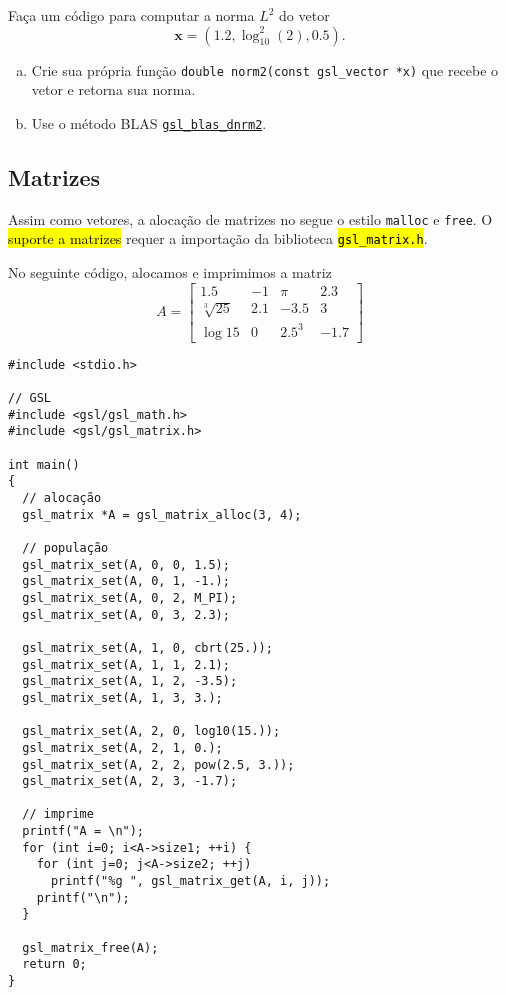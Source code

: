 \documentclass[12pt]{article}
\begin{document}
\begin{exr}
  Faça um código para computar a norma $L^2$ do vetor
  \begin{equation}
    \pmb{x} = (1.2, \log_{10}^2(2), 0.5).
  \end{equation}
  \begin{enumerate}[a)]
  \item Crie sua própria função \lstinline+double norm2(const gsl_vector *x)+ que recebe o vetor e retorna sua norma.
  \item Use o método BLAS \href{https://www.gnu.org/software/gsl/doc/html/blas.html\#c.gsl_blas_dnrm2}{\lstinline+gsl_blas_dnrm2+}.
  \end{enumerate}
\end{exr}

\subsection{Matrizes}\label{sec_mat_subsec_mat}

Assim como vetores, a alocação de matrizes no {\gsl} segue o estilo \lstinline!malloc! e \lstinline!free!. O \hl{suporte a matrizes} requer a importação da biblioteca \hl{\texttt{gsl\_matrix.h}}.

\begin{ex}
  No seguinte código, alocamos e imprimimos a matriz
  \begin{equation}
    A =
    \begin{bmatrix}
      1.5 & -1 & \pi & 2.3\\
      \sqrt[3]{25} & 2.1 & -3.5 & 3\\
      \log 15 & 0 & 2.5^3 & -1.7
    \end{bmatrix}
  \end{equation}

\begin{lstlisting}[caption=matriz.cc]
#include <stdio.h>

// GSL
#include <gsl/gsl_math.h>
#include <gsl/gsl_matrix.h>

int main()
{
  // alocação
  gsl_matrix *A = gsl_matrix_alloc(3, 4);

  // população
  gsl_matrix_set(A, 0, 0, 1.5);
  gsl_matrix_set(A, 0, 1, -1.);
  gsl_matrix_set(A, 0, 2, M_PI);
  gsl_matrix_set(A, 0, 3, 2.3);

  gsl_matrix_set(A, 1, 0, cbrt(25.));
  gsl_matrix_set(A, 1, 1, 2.1);
  gsl_matrix_set(A, 1, 2, -3.5);
  gsl_matrix_set(A, 1, 3, 3.);

  gsl_matrix_set(A, 2, 0, log10(15.));
  gsl_matrix_set(A, 2, 1, 0.);
  gsl_matrix_set(A, 2, 2, pow(2.5, 3.));
  gsl_matrix_set(A, 2, 3, -1.7);

  // imprime
  printf("A = \n");
  for (int i=0; i<A->size1; ++i) {
    for (int j=0; j<A->size2; ++j)
      printf("%g ", gsl_matrix_get(A, i, j));
    printf("\n");
  }

  gsl_matrix_free(A);
  return 0;
}
\end{lstlisting}
\end{ex}
\end{document}
